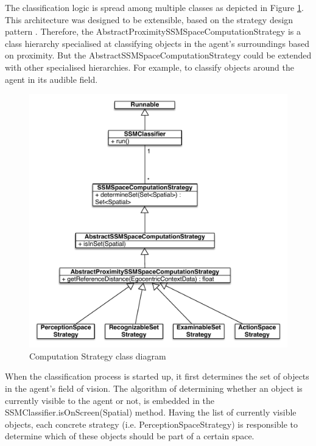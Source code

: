 The classification logic is spread among multiple classes as depicted in Figure \ref{fig:impl_computation_strategy}. This architecture was designed to be extensible, based on the strategy design pattern \cite{gamma1994design}. Therefore, the AbstractProximitySSMSpaceComputationStrategy is a class hierarchy specialised at classifying objects in the agent's surroundings based on proximity. But the AbstractSSMSpaceComputationStrategy could be extended with other specialised hierarchies. For example, to classify objects around the agent in its audible field.
\begin{figure}[H]
	\centering
	\includegraphics[width=\linewidth]{gfx/Chapter4/computation_strategy}
	\caption{Computation Strategy class diagram}
	\label{fig:impl_computation_strategy}
\end{figure}

When the classification process is started up, it first determines the set of objects in the agent's field of vision. The algorithm of determining whether an object is currently visible to the agent or not, is embedded in the SSMClassifier.isOnScreen(Spatial) method. Having the list of currently visible objects, each concrete strategy (i.e. PerceptionSpaceStrategy) is responsible to determine which of these objects should be part of a certain space.\\

